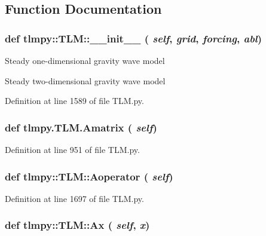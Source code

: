 \subsection{Function Documentation}
\hypertarget{namespacetlmpy_1_1TLM_ae75e2d198f207d795ffd60db3d926f0e}{
\subsubsection[{\_\-\_\-init\_\-\_\-}]{\setlength{\rightskip}{0pt plus 5cm}def tlmpy::TLM::\_\-\_\-init\_\-\_\- ( {\em self}, \/   {\em grid}, \/   {\em forcing}, \/   {\em abl})}}
\label{namespacetlmpy_1_1TLM_ae75e2d198f207d795ffd60db3d926f0e}
\begin{DoxyVerb}
Steady one-dimensional gravity wave model
\end{DoxyVerb}


\begin{DoxyVerb}
Steady two-dimensional gravity wave model
\end{DoxyVerb}
 

Definition at line 1589 of file TLM.py.\hypertarget{namespacetlmpy_1_1TLM_a3a822c47ba30dc38ed9fafea4350292e}{
\subsubsection[{Amatrix}]{\setlength{\rightskip}{0pt plus 5cm}def tlmpy.TLM.Amatrix ( {\em self})}}
\label{namespacetlmpy_1_1TLM_a3a822c47ba30dc38ed9fafea4350292e}


Definition at line 951 of file TLM.py.\hypertarget{namespacetlmpy_1_1TLM_a9fe851d277eca6ca4d22867b6c51b9a3}{
\subsubsection[{Aoperator}]{\setlength{\rightskip}{0pt plus 5cm}def tlmpy::TLM::Aoperator ( {\em self})}}
\label{namespacetlmpy_1_1TLM_a9fe851d277eca6ca4d22867b6c51b9a3}


Definition at line 1697 of file TLM.py.\hypertarget{namespacetlmpy_1_1TLM_a4cc641ba8986e09dd75d4a3ce6426438}{
\subsubsection[{Ax}]{\setlength{\rightskip}{0pt plus 5cm}def tlmpy::TLM::Ax ( {\em self}, \/   {\em x})}}
\label{namespacetlmpy_1_1TLM_a4cc641ba8986e09dd75d4a3ce6426438}


